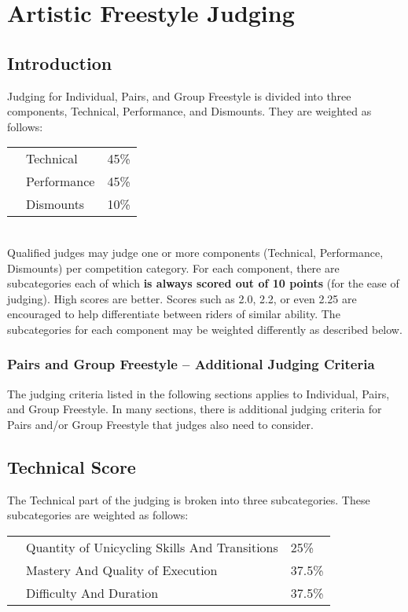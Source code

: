 \chapter{Artistic Freestyle Judging}
\section{Introduction}
Judging for Individual, Pairs, and Group Freestyle is divided into three components, Technical, Performance, and Dismounts.
They are weighted as follows:

\begin{tabular}{l l l}
 & Technical & 45\% \\
 & Performance & 45\% \\
 & Dismounts & 10\% \\
\end{tabular}\\

Qualified judges may judge one or more components (Technical, Performance, Dismounts) per competition category.
For each component, there are subcategories each of which \textbf{is always scored out of 10 points} (for the ease of judging).
High scores are better.
Scores such as 2.0, 2.2, or even 2.25 are encouraged to help differentiate between riders of similar ability.
The subcategories for each component may be weighted differently as described below.

\subsection{Pairs and Group Freestyle -- Additional Judging Criteria}
The judging criteria listed in the following sections applies to Individual, Pairs, and Group Freestyle. In many sections, there is additional judging criteria for Pairs and/or Group Freestyle that judges also need to consider.

\section{Technical Score \label{sec:freestyle_technical-score}}
The Technical part of the judging is broken into three subcategories.
These subcategories are weighted as follows:

\begin{tabular}{l l l}
 & Quantity of Unicycling Skills And Transitions & 25\% \\
 & Mastery And Quality of Execution & 37.5\% \\
 & Difficulty And Duration & 37.5\% \\
\end{tabular}

